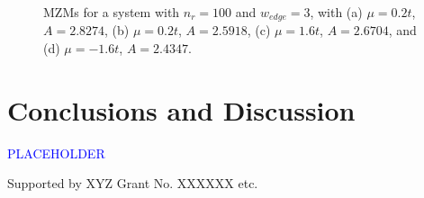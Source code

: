 \documentclass[aps,prb,showpacs,amsmath,amssymb,superscriptaddress]{revtex4-2}
\newcommand{\Blue}[1]{\textcolor{blue}{#1}}
\begin{document}
\begin{figure}[]
  \hfill
  \hfill
  \hfill
  \hfill
  \caption{MZMs for a system with $n_r=100$ and $w_{edge}=3$, with (a) $\mu=0.2t$, $A = 2.8274$, (b) $\mu=0.2t$, $A = 2.5918$, (c) $\mu=1.6t$, $A = 2.6704$, and (d) $\mu=-1.6t$, $A = 2.4347$.}
  \label{fig: mzm-wavefunctions}
\end{figure}

\section{Conclusions and Discussion}

\Blue{PLACEHOLDER}


\begin{acknowledgements}
  Supported by XYZ Grant No. XXXXXX etc.
\end{acknowledgements}



\end{document}
